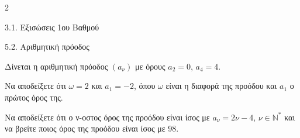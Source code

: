 \begin{ylh}{2}
    \item 3.1. Εξισώσεις 1ου Βαθμού
    \item 5.2. Αριθμητική πρόοδος
\end{ylh}
Δίνεται η αριθμητική πρόοδος $(a_\nu)$ με όρους $a_2 = 0$, $a_4 = 4$.
\begin{alist}
\item Να αποδείξετε ότι $\omega = 2$ και $a_1 = -2$, όπου $\omega$ είναι η διαφορά της προόδου και $a_1$ ο πρώτος όρος της.
\item Να αποδείξετε ότι ο ν-οστος όρος της προόδου είναι ίσος με $a_\nu = 2\nu - 4$, $\nu \in \mathbb{N}^*$ και να βρείτε ποιος όρος της προόδου είναι ίσος με $98$.
\end{alist}

